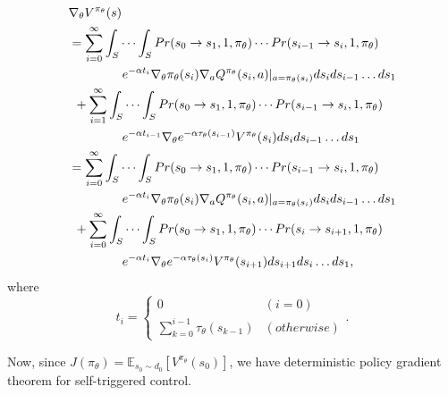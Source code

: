 \documentclass[english, dvipdfmx]{ampmt}             %
\newcommand{\expect}{\mathbb{E}}
\begin{document}
\begin{align}
	&\nabla_{\theta}V^{\pi_{\theta}}(s) \nonumber \\
	&= \sum_{i=0}^{\infty}\int_{S}\cdots\int_{S}Pr(s_0\to s_1,1,\pi_{\theta})\cdots Pr(s_{i-1}\to s_i,1,\pi_{\theta})\nonumber\\
	&\hspace{10ex}e^{-\alpha t_i}\nabla_{\theta}\pi_{\theta}(s_i)\nabla_aQ^{\pi_{\theta}}(s_i,a)|_{a=\pi_{\theta}(s_i)}ds_ids_{i-1}\ldots ds_1\nonumber\\
	&\hspace{1ex}+\sum_{i=1}^{\infty}\int_{S}\cdots\int_{S}Pr(s_0\to s_1,1,\pi_{\theta})\cdots Pr(s_{i-1}\to s_i,1,\pi_{\theta})\nonumber\\
	&\hspace{10ex}e^{-\alpha t_{i-1}}\nabla_{\theta}e^{-\alpha\tau_{\theta}(s_{i-1})}V^{\pi_{\theta}}(s_{i})ds_ids_{i-1}\ldots ds_1\nonumber\\
	&= \sum_{i=0}^{\infty}\int_{S}\cdots\int_{S}Pr(s_0\to s_1,1,\pi_{\theta})\cdots Pr(s_{i-1}\to s_i,1,\pi_{\theta})\nonumber\\
	&\hspace{10ex}e^{-\alpha t_i}\nabla_{\theta}\pi_{\theta}(s_i)\nabla_aQ^{\pi_{\theta}}(s_i,a)|_{a=\pi_{\theta}(s_i)}ds_ids_{i-1}\ldots ds_1\nonumber\\
	&\hspace{1ex}+\sum_{i=0}^{\infty}\int_{S}\cdots\int_{S}Pr(s_0\to s_1,1,\pi_{\theta})\cdots Pr(s_{i}\to s_{i+1},1,\pi_{\theta})\nonumber\\
	&\hspace{10ex}e^{-\alpha t_{i}}\nabla_{\theta}e^{-\alpha\tau_{\theta}(s_{i})}V^{\pi_{\theta}}(s_{i+1})ds_{i+1}ds_{i}\ldots ds_1,
\end{align}
where 
\begin{equation}
	t_i = \begin{cases}
    		0 & (i=0) \\
    		\sum_{k=0}^{i-1}\tau_{\theta}(s_{k-1}) & (otherwise)
  		\end{cases}.
\end{equation}\par
Now, since $J(\pi_{\theta}) = \expect_{s_0\sim d_0}[V^{\pi_{\theta}}(s_0)]$, we have deterministic policy gradient theorem for self-triggered control.
\end{document}
